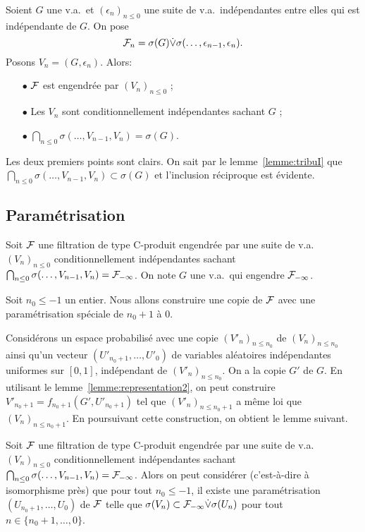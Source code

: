 \documentclass[12pt,a4paper]{article}
\begin{document}
\begin{exemple}
Soient $G$ une v.a.\ et  ${(\epsilon_n)}_{n \leq 0}$ une suite de v.a.\ indépendantes 
entre elles qui est indépendante de $G$. On pose 
$$
\mathcal{F}_n = \sigma(G) \dot{\vee} \sigma(\ldots, \epsilon_{n-1}, \epsilon_n).
$$
Posons $V_n = (G, \epsilon_n)$. 
Alors: 
\begin{itemize}
\item[$\bullet$]  $\mathcal{F}$ est engendrée par  ${(V_n)}_{n \leq 0}$ ; 

\item[$\bullet$] Les $V_n$ sont conditionnellement indépendantes sachant $G$ ;

\item[$\bullet$]  $\bigcap_{n \leq 0}\sigma(\ldots, V_{n-1}, V_n) = \sigma(G)$.
\end{itemize}
Les deux premiers points sont clairs. 
On sait par le lemme~\ref{lemme:tribuI} que 
$\bigcap_{n \leq 0}\sigma(\ldots, V_{n-1}, V_n) \subset \sigma(G)$ et l'inclusion 
réciproque est évidente.
\end{exemple}




\subsection{Paramétrisation}

Soit $\mathcal{F}$ une filtration de type C-produit engendrée par 
une suite de v.a.\ ${(V_n)}_{n \leq 0}$ conditionnellement indépendantes 
sachant $\bigcap_{n \leq 0}\sigma(\ldots, V_{n-1}, V_n) = \mathcal{F}_{-\infty}$. 
On note $G$ une v.a.\ qui engendre $\mathcal{F}_{-\infty}$.

Soit $n_0 \leq -1$ un entier. Nous allons construire une copie de 
$\mathcal{F}$ avec une paramétrisation spéciale de $n_0+1$ à $0$. 

Considérons un espace probabilisé avec une copie ${(V'_n)}_{n \leq n_0}$ 
de ${(V_n)}_{n \leq n_0}$ ainsi qu'un vecteur $(U'_{n_0+1}, \ldots, U'_0)$ 
de variables aléatoires indépendantes uniformes sur $[0,1]$, indépendant 
de ${(V'_n)}_{n \leq n_0}$. 
On a la copie $G'$ de $G$. 
En utilisant le lemme~\ref{lemme:representation2}, on peut construire 
$V'_{n_0+1} = f_{n_0+1}(G', U'_{n_0+1})$ tel que 
${(V'_n)}_{n \leq n_0+1}$ a même loi que ${(V_n)}_{n \leq n_0+1}$. 
En poursuivant cette construction, on obtient le lemme suivant. 

\begin{lemme}\label{lemme:parametrisation}
Soit $\mathcal{F}$ une filtration de type C-produit engendrée par 
une suite de v.a.\ ${(V_n)}_{n \leq 0}$  conditionnellement indépendantes 
sachant $\bigcap_{n \leq 0}\sigma(\ldots, V_{n-1}, V_n) = \mathcal{F}_{-\infty}$. 
Alors on peut considérer (c'est-à-dire à isomorphisme près) que 
pour tout $n_0 \leq -1$, il existe une paramétrisation 
$(U_{n_0+1}, \ldots, U_0)$  de $\mathcal{F}$ 
telle que $\sigma(V_n) \subset \mathcal{F}_{-\infty} \dot{\vee} \sigma(U_n)$ 
pour tout  $n \in \{n_0+1, \ldots, 0\}$.
\end{lemme}
\end{document}
